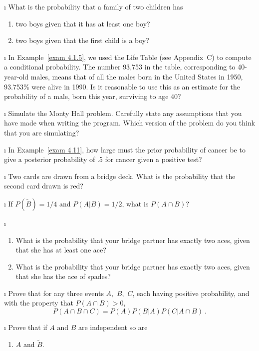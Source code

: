 \begin{LJSItem}
\i\label{exer 4.1.9} What is the probability that a family of two children has
\begin{enumerate}
\item two boys given that it has at least one boy?

\item two boys given that the first child is a boy?
\end{enumerate}

\i\label{exer 4.1.9.5}  In Example~\ref{exam 4.1.5}, we used the Life Table (see Appendix~C)
to compute a conditional probability.  The number 93{,}753 in the table, corresponding to
40-year-old males, means that of all the males born in the United States in 1950, 93.753\% were
alive in 1990.  Is it reasonable to use this as an estimate for the probability of a male, born
this year, surviving to age 40? 

\i\label{exer 4.1.9.6} Simulate the Monty Hall problem.  Carefully state any assumptions
that you have made when writing the program.  Which version of the problem do you think that
you are simulating?

\i\label{exer 4.1.10} In Example~\ref{exam 4.11}, how large must the prior probability of
cancer be to give a posterior probability of .5 for cancer given a positive
test?

\i\label{exer 4.1.11} Two cards are drawn from a bridge deck.  What is the probability that
the second card drawn is red?

\i\label{exer 4.1.12} If $P(\tilde B) = 1/4$ and $P(A|B) = 1/2$, what is $P(A \cap B)$?

\i\label{exer 4.1.13}
\begin{enumerate} 
\item What is the probability that your bridge partner has exactly two aces,
given that she has at least one ace?

\item What is the probability that your bridge partner has exactly two aces,
given that she has the ace of spades?
\end{enumerate}

\i\label{exer 4.1.14} Prove that for any three events $A$,~$B$,~$C$, each having positive
probability, and with the property that $P(A \cap B) > 0$,
$$
P(A \cap B \cap C) = P(A)P(B|A)P(C|A \cap B)\ .
$$

\i\label{exer 4.1.15} Prove that if $A$ and $B$ are independent so are
\begin{enumerate}
\item $A$ and $\tilde B$.


\end{enumerate}
\end{LJSItem}
